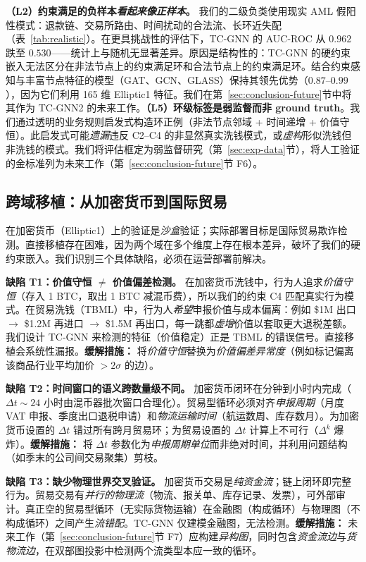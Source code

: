 \documentclass[journal,onecolumn]{IEEEtran}
\begin{document}
\textbf{（L2）约束满足的负样本\emph{看起来像正样本}。} 我们的二级负类使用现实 AML 假阳性模式：退款链、交易所路由、时间扰动的合法流、长环近失配（表~\ref{tab:realistic}）。在更具挑战性的评估下，TC-GNN 的 AUC-ROC 从 $0.962$ 跌至 $0.530$——统计上与随机无显著差异。原因是结构性的：TC-GNN 的硬约束嵌入无法区分在非法节点上的约束满足环和合法节点上的约束满足环。结合约束感知与丰富节点特征的模型（GAT、GCN、GLASS）保持其领先优势（$0.87$--$0.99$），因为它们利用 165 维 Elliptic1 特征。我们在第~\ref{sec:conclusion-future}节中将其作为 \textsc{TC-GNN}2 的未来工作。\textbf{（L5）环级标签是弱监督而非 ground truth}。我们通过透明的业务规则启发式构造环正例（非法节点邻域 + 时间递增 + 价值守恒）。此启发式可能\emph{遗漏}违反 C2--C4 的非显然真实洗钱模式，或\emph{虚构}形似洗钱但非洗钱的模式。我们将评估框定为弱监督研究（第~\ref{sec:exp-data}节），将人工验证的金标准列为未来工作（第~\ref{sec:conclusion-future}节 F6）。

\subsection{跨域移植：从加密货币到国际贸易}
\label{sec:transfer}

在加密货币（Elliptic1）上的验证是\emph{沙盒}验证；实际部署目标是国际贸易欺诈检测。直接移植存在困难，因为两个域在多个维度上存在根本差异，破坏了我们的硬约束嵌入。我们识别三个具体缺陷，必须在运营部署前解决。

\textbf{缺陷 T1：价值守恒 $\neq$ 价值偏差检测。} 在加密货币洗钱中，行为人追求\emph{价值守恒}（存入 1 BTC，取出 1 BTC 减混币费），所以我们的约束 C4 匹配真实行为模式。在贸易洗钱（TBML）中，行为人\emph{希望}申报价值与成本偏离：例如 \$1M 出口 $\to$ \$1.2M 再进口 $\to$ \$1.5M 再出口，每一跳都\emph{虚增}价值以套取更大退税差额。我们设计 TC-GNN 来检测的特征（价值稳定）正是 TBML 的错误信号。直接移植会系统性漏报。\textbf{缓解措施：} 将\emph{价值守恒}替换为\emph{价值偏差异常度}（例如标记偏离该商品行业平均加价 $> 2\sigma$ 的边）。

\textbf{缺陷 T2：时间窗口的语义跨数量级不同。} 加密货币闭环在分钟到小时内完成（$\Delta t \sim 24$ 小时由混币器批次窗口合理化）。贸易型循环必须对齐\emph{申报周期}（月度 VAT 申报、季度出口退税申请）和\emph{物流运输时间}（航运数周、库存数月）。为加密货币设置的 $\Delta t$ 错过所有跨月贸易环；为贸易设置的 $\Delta t$ 计算上不可行（$\Delta^k$ 爆炸）。\textbf{缓解措施：} 将 $\Delta t$ 参数化为\emph{申报周期单位}而非绝对时间，并利用问题结构（如季末的公司间交易聚集）剪枝。

\textbf{缺陷 T3：缺少物理世界交叉验证。} 加密货币交易是\emph{纯资金流}；链上闭环即完整行为。贸易交易有\emph{并行的物理流}（物流、报关单、库存记录、发票），可外部审计。真正空的贸易型循环（无实际货物运输）在金融图（构成循环）与物理图（不构成循环）之间产生\emph{流错配}。TC-GNN 仅建模金融图，无法检测。\textbf{缓解措施：} 未来工作（第~\ref{sec:conclusion-future}节 F7）应构建\emph{异构图}，同时包含\emph{资金流边}与\emph{货物流边}，在双部图投影中检测两个流类型本应一致的循环。
\end{document}

